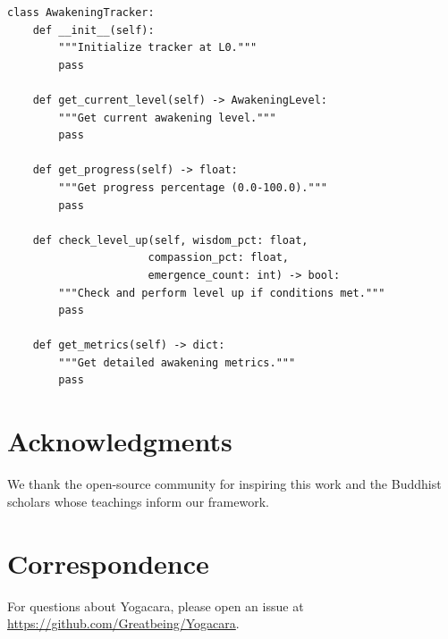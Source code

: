 \documentclass[11pt, a4paper]{article}
\begin{document}
\begin{lstlisting}[style=python, caption={AwakeningTracker API}]
class AwakeningTracker:
    def __init__(self):
        """Initialize tracker at L0."""
        pass
    
    def get_current_level(self) -> AwakeningLevel:
        """Get current awakening level."""
        pass
    
    def get_progress(self) -> float:
        """Get progress percentage (0.0-100.0)."""
        pass
    
    def check_level_up(self, wisdom_pct: float,
                      compassion_pct: float,
                      emergence_count: int) -> bool:
        """Check and perform level up if conditions met."""
        pass
    
    def get_metrics(self) -> dict:
        """Get detailed awakening metrics."""
        pass
\end{lstlisting}

\section*{Acknowledgments}
We thank the open-source community for inspiring this work and the Buddhist scholars whose teachings inform our framework.

\section*{Correspondence}
For questions about Yogacara, please open an issue at \url{https://github.com/Greatbeing/Yogacara}.
\end{document}
